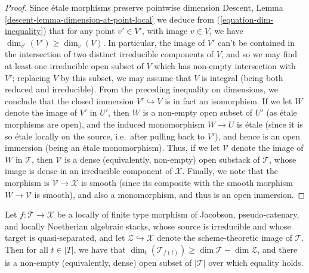 \begin{proof}
\medskip\noindent
Since \'etale morphisms preserve pointwise dimension
Descent, Lemma \ref{descent-lemma-dimension-at-point-local}
we deduce from (\ref{equation-dim-inequality})
that for any point $v' \in V'$,
with image $v \in V$, we have
$\dim_{v'}( V') \geq \dim_v(V)$.
In particular, the image of $V'$ can't be contained in the intersection
of two distinct irreducible components of $V$, and so we may find
at least one irreducible open subset of $V$ which has non-empty intersection
with $V'$; replacing $V$ by this subset, we may assume that $V$ is integral
(being both reduced and irreducible).  From the preceding inequality
on dimensions, we conclude that the closed immersion $V' \hookrightarrow V$
is in fact an isomorphism.
If we let $W$ denote the image of $V'$
in $U'$, then $W$ is a non-empty
open subset of $U'$ (as \'etale morphisms are open),
and the induced monomorphism $W \to U$ is \'etale
(since it is so \'etale locally on the source, i.e.\ after pulling back
to $V'$), and hence is an open immersion (being an \'etale monomorphism).
Thus, if we let $\mathcal{V}$ denote the image of $W$ in $\mathcal{T}$,
then $\mathcal{V}$ is a dense (equivalently, non-empty) open substack of
$\mathcal{T}$,
whose image is dense in an irreducible component of $\mathcal{X}$.
Finally,
we note that the morphism is $\mathcal{V} \to \mathcal{X}$ is smooth
(since its composite
with the smooth morphism $W\to \mathcal{V}$ is smooth),
and also a monomorphism, and thus is an open immersion.
\end{proof}

\begin{lemma}
\label{lemma-dims-of-images}
Let $f: \mathcal{T} \to \mathcal{X}$ be a locally of finite type
morphism of Jacobson, pseudo-catenary, and locally Noetherian
algebraic stacks,
whose source is irreducible and whose target is quasi-separated,
and let $\mathcal{Z} \hookrightarrow \mathcal{X}$ denote the scheme-theoretic
image of $\mathcal{T}$.
Then for all $t \in |T|$,
we have that
$\dim_t( \mathcal{T}_{f(t)}) \geq \dim \mathcal{T}  - \dim \mathcal{Z}$,
and there is a non-empty (equivalently, dense)
open subset of $|\mathcal{T}|$ over which equality holds.
\end{lemma}

